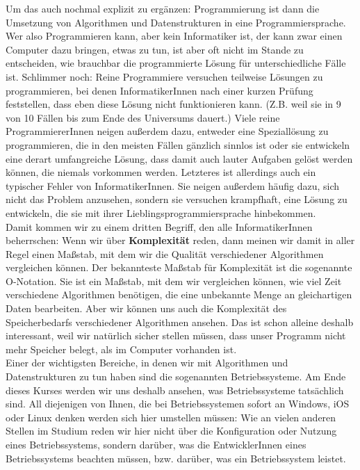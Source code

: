 Um das auch nochmal explizit zu ergänzen: Programmierung ist dann die Umsetzung von Algorithmen und Datenstrukturen in eine Programmiersprache. Wer also Programmieren kann, aber kein Informatiker ist, der kann zwar einen Computer dazu bringen, etwas zu tun, ist aber oft nicht im Stande zu entscheiden, wie brauchbar die programmierte Lösung für unterschiedliche Fälle ist. Schlimmer noch: Reine Programmiere versuchen teilweise Lösungen zu programmieren, bei denen InformatikerInnen nach einer kurzen Prüfung feststellen, dass eben diese Lösung nicht funktionieren kann. (Z.B. weil sie in 9 von 10 Fällen bis zum Ende des Universums dauert.) Viele reine ProgrammiererInnen neigen außerdem dazu, entweder eine Speziallösung zu programmieren, die in den meisten Fällen gänzlich sinnlos ist oder sie entwickeln eine derart umfangreiche Lösung, dass damit auch lauter Aufgaben gelöst werden können, die niemals vorkommen werden. Letzteres ist allerdings auch ein typischer Fehler von InformatikerInnen. Sie neigen außerdem häufig dazu, sich nicht das Problem anzusehen, sondern sie versuchen krampfhaft, eine Lösung zu entwickeln, die sie mit ihrer Lieblingsprogrammiersprache hinbekommen.\\

Damit kommen wir zu einem dritten Begriff, den alle InformatikerInnen beherrschen: Wenn wir über \textbf{Komplexität} reden, dann meinen wir damit in aller Regel einen Maßstab, mit dem wir die Qualität verschiedener Algorithmen vergleichen können. Der bekannteste Maßstab für Komplexität ist die sogenannte O-Notation. Sie ist ein Maßstab, mit dem wir vergleichen können, wie viel Zeit verschiedene Algorithmen benötigen, die eine unbekannte Menge an gleichartigen Daten bearbeiten. Aber wir können uns auch die Komplexität des Speicherbedarfs verschiedener Algorithmen ansehen. Das ist schon alleine deshalb interessant, weil wir natürlich sicher stellen müssen, dass unser Programm nicht mehr Speicher belegt, als im Computer vorhanden ist.\\

Einer der wichtigsten Bereiche, in denen wir mit Algorithmen und Datenstrukturen zu tun haben sind die sogenannten Betriebssysteme. Am Ende dieses Kurses werden wir uns deshalb ansehen, was Betriebssysteme tatsächlich sind. All diejenigen von Ihnen, die bei Betriebssystemen sofort an Windows, iOS oder Linux denken werden sich hier umstellen müssen: Wie an vielen anderen Stellen im Studium reden wir hier nicht über die Konfiguration oder Nutzung eines Betriebssystems, sondern darüber, was die EntwicklerInnen eines Betriebssystems beachten müssen, bzw. darüber, was ein Betriebssystem leistet.\\

